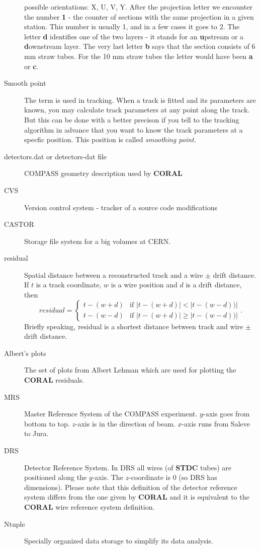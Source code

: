 \documentclass[a4paper,12pt]{article}
\begin{document}
\begin{description}
        possible orientations: X, U, V, Y. After the projection letter we encounter the number
        {\bf 1} - the counter of sections with the same projection in a given station.
        This number is usually 1, and in a few cases it goes to 2.
        The letter {\bf d} identifies one of the two layers - it stands for an
        {\bf u}pstream or a {\bf d}ownstream layer. The very last letter {\bf b}
        says that the section
        consists of 6 mm straw tubes. For the 10 mm straw tubes the letter would have been
        {\bf a} or {\bf c}.
\item[Smooth point] The term is used in tracking. When a track is fitted and its parameters
        are known, you may calculate track parameters at any point along the track. But this can
        be done with a better precison if you tell to the tracking algorithm in advance that you want
        to know the track parameters at a specfic position. This position is called {\it smoothing point}.
\item[detectors.dat or detectors-dat file] COMPASS geometry description used by {\bf CORAL}
\item[CVS] Version control system - tracker of a source code modifications
\item[CASTOR] Storage file system for a big volumes at CERN.
\item[residual] Spatial distance between a reconstructed track and a wire $\pm$ drift distance.
      If $t$ is a track coordinate, $w$ is a wire position and $d$ is a drift distance, then
      $$residual = \left\{
        \begin{array}{ll}
            t-(w+d) & \mbox{if  } |t-(w+d)|<|t-(w-d))| \\
            t-(w-d) & \mbox{if  } |t-(w+d)|\geq|t-(w-d))|
        \end{array}
        \right. .
      $$
      Briefly speaking, residual is a shortest distance between track and wire $\pm$ drift distance.
\item[Albert's plots] The set of plots from Albert Lehman which are used for plotting the {\bf CORAL} residuals.
\item[MRS] Master Reference System of the COMPASS experiment. $y$-axis goes from bottom to top.
         $z$-axis is in the direction of beam. $x$-axis runs from Saleve to Jura.
\item[DRS] Detector Reference System. In DRS all wires (of {\bf STDC} tubes) are positioned along the $y$-axis.
         The $z$-coordinate is 0 (so DRS has dimensions). Please note that this definition of the detector 
         reference system differs from the one given by {\bf CORAL} and it is equivalent to the {\bf CORAL} wire 
         reference system definition.
\item[Ntuple] Specially organized data storage to simplify its data analysis.
\end{description}
\end{document}
